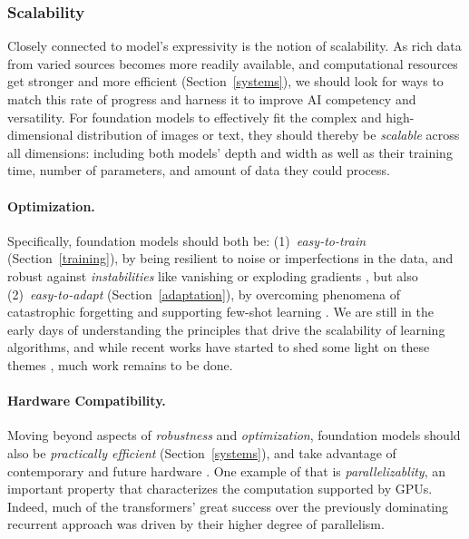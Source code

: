 \subsubsection{Scalability} 
\label{sec:modeling-scalability}

Closely connected to model's expressivity is the notion of scalability. As rich data from varied sources becomes more readily available, and computational resources get stronger and more efficient (Section~\ref{systems}), we should look for ways to match this rate of progress and harness it to improve AI competency and versatility. For foundation models to effectively fit the complex and high-dimensional distribution of images or text, they should thereby be \textit{scalable} across all dimensions: including both models' depth and width as well as their training time, number of parameters, and amount of data they could process. 

\paragraph{Optimization.} Specifically, foundation models should both be: (1)~\textit{easy-to-train} (Section~\ref{training}), by being resilient to noise or imperfections in the data, and robust against \textit{instabilities} like vanishing \citep{helfrich2018orthogonal, glorot2010understanding} or exploding gradients \citep{lstms,nair2010rectified}, but also (2)~\textit{easy-to-adapt} (Section~\ref{adaptation}), by overcoming phenomena of catastrophic forgetting \citep{catastroph} and supporting few-shot learning \citep{fewshot}. We are still in the early days of understanding the principles that drive the scalability of learning algorithms, and while recent works have started to shed some light on these themes \citep{liu2020understanding, kuditipudi2020explaining, nakkiran2019deep}, much work remains to be done.

\paragraph{Hardware Compatibility.} Moving beyond aspects of \textit{robustness} and \textit{optimization}, foundation models should also be \textit{practically efficient} (Section~\ref{systems}), and take advantage of contemporary and future hardware \citep{2009_06489}. One example of that is \textit{parallelizablity}, an important property that characterizes the computation supported by GPUs. Indeed, much of the transformers' great success over the previously dominating recurrent approach was driven by their higher degree of parallelism. 

